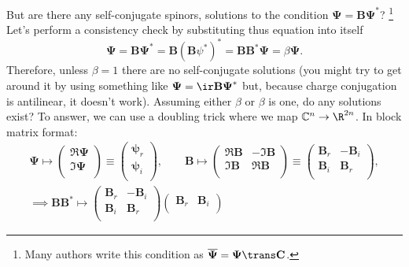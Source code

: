 \documentclass[11pt]{article}
\newcommand{\B}{\mathbf{B}}
\renewcommand{\C}{\mathbf{C}}
\newcommand{\Cb}{\mathbb{C}}
\newcommand{\psib}{\boldsymbol{\psi}}
\newcommand{\Psib}{\boldsymbol{\Psi}}
\begin{document}
But are there any self-conjugate spinors, \ie solutions to the condition \( \Psib = \B \Psib^\ast \)?%
\footnote{Many authors write this condition as \( \overline{\Psib} = \Psib\trans \C \).}
Let's perform a consistency  check by substituting thus equation into itself
%
\begin{equation*}
  \Psib = \B \Psib^\ast = \B (\B \psi^\ast)^\ast = \B \B^\ast \Psib = \beta \Psib.
\end{equation*}
%
Therefore, unless $\beta = 1$ there are no self-conjugate solutions
(you might try to get around it by using something like \( \Psib = \ir \B \Psib^\ast \) but, because charge conjugation is antilinear, it doesn't work).
Assuming either $\beta$ or $\beta$ is one, do any solutions exist?
To answer, we can use a doubling trick where we map $\Cb^n \to \R^{2n}$.
In block matrix format:
%
\begin{equation*}
\begin{gathered}
  \Psib \longmapsto
            \begin{pmatrix}
              \Re \Psib \\
              \Im \Psib \\
            \end{pmatrix}
  \equiv    \begin{pmatrix}
              \psib_r \\
              \psib_i \\
            \end{pmatrix}
  , \qquad
  \B \longmapsto 
        \begin{pmatrix}
          \Re \B & -\Im \B \\
          \Im \B &  \Re \B \\
        \end{pmatrix}
  \equiv \begin{pmatrix}
           \B_r & -\B_i \\
           \B_i &  \B_r \\
         \end{pmatrix}
  , \\
  \implies
  \B \B^\ast \longmapsto
         \begin{pmatrix}
           \B_r & -\B_i \\
           \B_i &  \B_r \\
         \end{pmatrix}
         \begin{pmatrix}
            \B_r & \B_i \\

\end{pmatrix}
\end{gathered}
\end{equation*}
\end{document}
